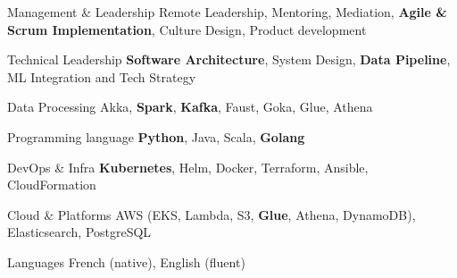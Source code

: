 

\begin{cvskills}
  \cvskill
    {Management \& Leadership} %
    {Remote Leadership, Mentoring, Mediation, \textbf{Agile \& Scrum Implementation}, Culture Design, Product development} %

\cvskill
  {Technical Leadership} %
  {\textbf{Software Architecture}, System Design, \textbf{Data Pipeline}, ML Integration and Tech Strategy} %


  \cvskill
    {Data Processing} %
    {Akka, \textbf{Spark}, \textbf{Kafka}, Faust, Goka, Glue, Athena} %

  \cvskill
    {Programming language} %
    {\textbf{Python}, Java, Scala, \textbf{Golang}} %

  \cvskill
    {DevOps \& Infra} %
    {\textbf{Kubernetes}, Helm, Docker, Terraform, Ansible, CloudFormation} %

  \cvskill
    {Cloud \& Platforms} %
    {AWS (EKS, Lambda, S3, \textbf{Glue}, Athena, DynamoDB), Elasticsearch, PostgreSQL} %

  \cvskill
    {Languages} %
    {French (native), English (fluent)} %

\end{cvskills}
